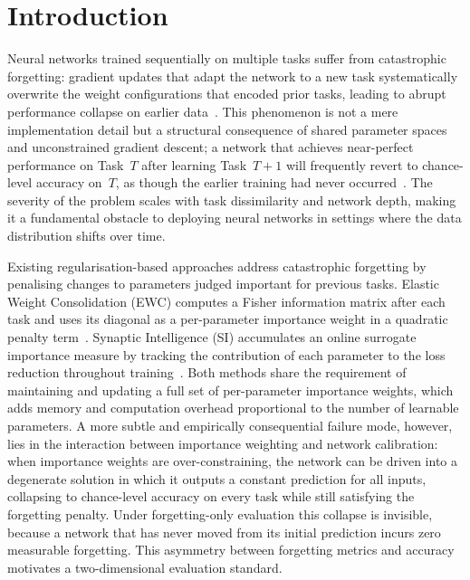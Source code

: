 \section{Introduction}
\label{sec:introduction}

Neural networks trained sequentially on multiple tasks suffer from catastrophic
forgetting: gradient updates that adapt the network to a new task systematically
overwrite the weight configurations that encoded prior tasks, leading to abrupt
performance collapse on earlier data~\cite{McCloskey1989}.
This phenomenon is not a mere implementation detail but a structural consequence
of shared parameter spaces and unconstrained gradient descent; a network that
achieves near-perfect performance on Task~$T$ after learning Task~$T{+}1$ will
frequently revert to chance-level accuracy on~$T$, as though the earlier training
had never occurred~\cite{Kirkpatrick2017}.
The severity of the problem scales with task dissimilarity and network depth,
making it a fundamental obstacle to deploying neural networks in settings where
the data distribution shifts over time.

Existing regularisation-based approaches address catastrophic forgetting by
penalising changes to parameters judged important for previous tasks.
Elastic Weight Consolidation (EWC) computes a Fisher information matrix after
each task and uses its diagonal as a per-parameter importance weight in a
quadratic penalty term~\cite{Kirkpatrick2017}.
Synaptic Intelligence (SI) accumulates an online surrogate importance measure
by tracking the contribution of each parameter to the loss reduction throughout
training~\cite{Zenke2017}.
Both methods share the requirement of maintaining and updating a full set of
per-parameter importance weights, which adds memory and computation overhead
proportional to the number of learnable parameters.
A more subtle and empirically consequential failure mode, however, lies in the
interaction between importance weighting and network calibration: when importance
weights are over-constraining, the network can be driven into a degenerate
solution in which it outputs a constant prediction for all inputs, collapsing
to chance-level accuracy on every task while still satisfying the forgetting
penalty.
Under forgetting-only evaluation this collapse is invisible, because a network
that has never moved from its initial prediction incurs zero measurable forgetting.
This asymmetry between forgetting metrics and accuracy motivates a two-dimensional
evaluation standard.

